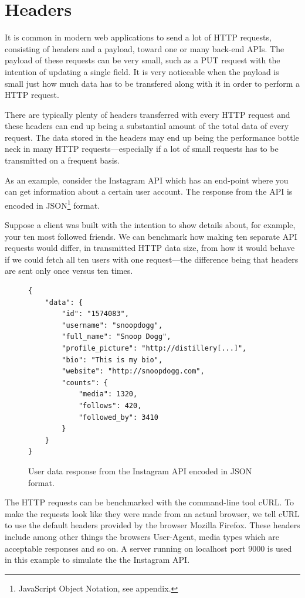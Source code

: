 \documentclass{cslthse-msc}
\begin{document}
\section{Headers}
\label{headers}

It is common in modern web applications to send a lot of HTTP requests, consisting of headers and a payload, toward one or many back-end APIs. The payload of these requests can be very small, such as a PUT request with the intention of updating a single field. It is very noticeable when the payload is small just how much data has to be transfered along with it in order to perform a HTTP request.

There are typically plenty of headers transferred with every HTTP request and these headers can end up being a substantial amount of the total data of every request. The data stored in the headers may end up being the performance bottle neck in many HTTP requests---especially if a lot of small requests has to be transmitted on a frequent basis.

As an example, consider the Instagram API\cite{instagram_api} which has an end-point where you can get information about a certain user account. The response from the API is encoded in JSON\footnote{JavaScript Object Notation, see appendix.} format. 

Suppose a client was built with the intention to show details about, for example, your ten most followed friends. We can benchmark how making ten separate API requests would differ, in transmitted HTTP data size, from how it would behave if we could fetch all ten users with one request---the difference being that headers are sent only once versus ten times.

\begin{figure}[H]
  \centering
    \begin{lstlisting}
{
    "data": {
        "id": "1574083",
        "username": "snoopdogg",
        "full_name": "Snoop Dogg",
        "profile_picture": "http://distillery[...]",
        "bio": "This is my bio",
        "website": "http://snoopdogg.com",
        "counts": {
            "media": 1320,
            "follows": 420,
            "followed_by": 3410
        }
    }
}
    \end{lstlisting}
  \caption{User data response from the Instagram API encoded in JSON format.}
\end{figure}

The HTTP requests can be benchmarked with the command-line tool cURL\cite{curl}. To make the requests look like they were made from an actual browser, we tell cURL to use the default headers provided by the browser Mozilla Firefox. These headers include among other things the browsers User-Agent, media types which are acceptable responses and so on. A server running on localhost port 9000 is used in this example to simulate the the Instagram API.
\end{document}
